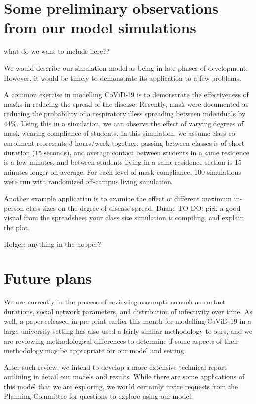 \documentclass[fleqn,10pt]{SelfArx} %
\newcommand{\ed}[1]{{\color{blue} #1}}
\begin{document}
\section{Some preliminary observations from our model simulations}
\label{sec:prelimresults}

\ed{what do we want to include here??}

We would describe our simulation model as being in late phases of development.  However, it would be timely to demonstrate its application to a few problems.  

A common exercise in modelling CoViD-19 is to demonstrate the effectiveness of masks in reducing the spread of the disease.  Recently, mask were documented as reducing the probability of a respiratory illess spreading between individuals by 44\%\cite{chu_physical_2020}.  Using this in a simulation, we can observe the effect of varying degrees of mask-wearing compliance of students.  In this simulation, we assume class co-enrolment represents 3 hours/week together, passing between classes is of short duration (15 seconds), and average contact between students in a same residence is a few minutes, and between students living in a same residence section is 15 minutes longer on average.   For each level of mask compliance, 100 simulations were run with randomized off-campus living simulation.  



Another example application is to examine the effect of different maximum in-person class sizes on the degree of disease spread.  \ed{Duane TO-DO:  pick a good visual from the spreadsheet your class size simulation is compiling, and explain the plot.}

\ed{Holger:  anything in the hopper?}

\section{Future plans}

We are currently in the process of reviewing assumptions such as contact durations, social network parameters, and distribution of infectivity over time.  As well, a paper released in pre-print earlier this month for modelling CoViD-19 in a large university setting has also used a fairly similar methodology to ours, and we are reviewing methodological differences to determine if some aspects of their methodology may be appropriate for our model and setting.

After such review, we intend to develop a more extensive technical report outlining in detail our models and results.  While there are some applications of this model that we are exploring, we would certainly invite requests from the Planning Committee for questions to explore using our model. 
\end{document}
